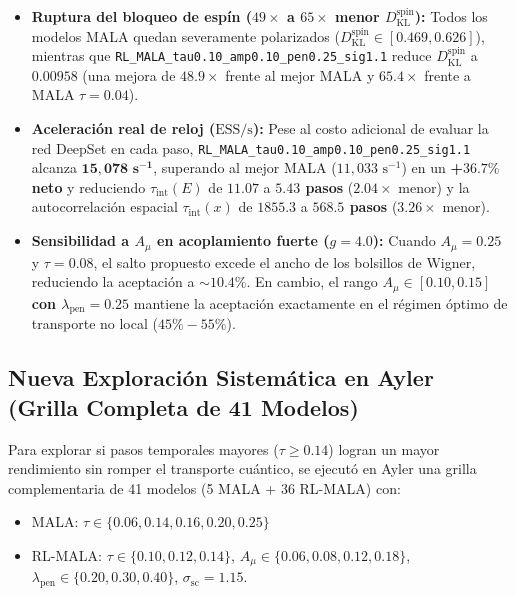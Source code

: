 \documentclass[10pt,a4paper]{article}
\begin{document}
\begin{itemize}
\item \textbf{Ruptura del bloqueo de espín ($49\times$ a $65\times$ menor $D_{\mathrm{KL}}^{\mathrm{spin}}$):} Todos los modelos MALA quedan severamente polarizados ($D_{\mathrm{KL}}^{\mathrm{spin}} \in [0.469, 0.626]$), mientras que \texttt{RL\_MALA\_tau0.10\_amp0.10\_pen0.25\_sig1.1} reduce $D_{\mathrm{KL}}^{\mathrm{spin}}$ a \textbf{$0.00958$} (una mejora de \textbf{$48.9\times$} frente al mejor MALA y \textbf{$65.4\times$} frente a MALA $\tau=0.04$).
\item \textbf{Aceleración real de reloj ($\mathrm{ESS/s}$):} Pese al costo adicional de evaluar la red DeepSet en cada paso, \texttt{RL\_MALA\_tau0.10\_amp0.10\_pen0.25\_sig1.1} alcanza \textbf{$\mathbf{15,078\text{ s}^{-1}}$}, superando al mejor MALA ($11,033\text{ s}^{-1}$) en un \textbf{+$36.7\%$ neto} y reduciendo $\tau_{\mathrm{int}}(E)$ de $11.07$ a \textbf{$5.43$ pasos} ($2.04\times$ menor) y la autocorrelación espacial $\tau_{\mathrm{int}}(x)$ de $1855.3$ a \textbf{$568.5$ pasos} ($3.26\times$ menor).
\item \textbf{Sensibilidad a $A_\mu$ en acoplamiento fuerte ($g=4.0$):} Cuando $A_\mu = 0.25$ y $\tau=0.08$, el salto propuesto excede el ancho de los bolsillos de Wigner, reduciendo la aceptación a $\sim 10.4\%$. En cambio, el rango \textbf{$A_\mu \in [0.10, 0.15]$ con $\lambda_{\mathrm{pen}} = 0.25$} mantiene la aceptación exactamente en el régimen óptimo de transporte no local ($45\% - 55\%$).
\end{itemize}




\subsection{Nueva Exploración Sistemática en Ayler (Grilla Completa de 41 Modelos)}

Para explorar si pasos temporales mayores ($\tau \ge 0.14$) logran un mayor rendimiento sin romper el transporte cuántico, se ejecutó en Ayler una grilla complementaria de 41 modelos (5 MALA + 36 RL-MALA) con:

\begin{itemize}
\item MALA: $\tau \in \{0.06, 0.14, 0.16, 0.20, 0.25\}$
\item RL-MALA: $\tau \in \{0.10, 0.12, 0.14\}$, $A_\mu \in \{0.06, 0.08, 0.12, 0.18\}$, $\lambda_{\mathrm{pen}} \in \{0.20, 0.30, 0.40\}$, $\sigma_{\mathrm{sc}} = 1.15$.
\end{itemize}
\end{document}

